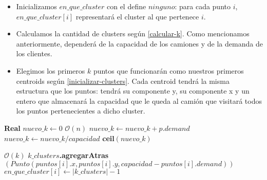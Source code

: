 \begin{itemize}
	\item Inicializamos $en\_que\_cluster$ con el define $ninguno$: para cada punto $i$, $en\_que\_cluster[i]$ representará el cluster al que pertenece $i$. 
	\item Calculamos la cantidad de clusters según \ref{calcular-k}. Como mencionamos anteriormente, dependerá de la capacidad de los camiones y de la demanda de los clientes.
	\item Elegimos los primeros $k$ puntos que funcionarán como nuestros primeros centroids según \ref{inicializar-clusters}. Cada centroid tendrá la misma estructura que los puntos: tendrá su componente y, su componente x y un entero que almacenará la capacidad que le queda al camión que visitará todos los puntos pertenecientes a dicho cluster.
\end{itemize}

\begin{algorithm}[H]
	\caption{\Comment $\mathcal{O}(n)$}
	\label{calcular-k}
	\begin{algorithmic}[1]
		\State \textbf{Real } $nuevo\_k \gets 0$
		 \Comment $\mathcal{O}(n)$
		\State $nuevo\_k \gets nuevo\_k + p.demand$
		\EndFor
		\State $nuevo\_k \gets nuevo\_k/capacidad$ 
		\State \Return \textbf{ceil}$(nuevo\_k)$
		\EndFunction
	\end{algorithmic}
\end{algorithm}

\begin{algorithm}[H]
	\caption{\Comment $\mathcal{O}(k)$}
	\label{inicializar-clusters}
	\begin{algorithmic}[1]
		 \Comment $\mathcal{O}(k)$
		\State $k\_clusters$\textbf{.agregarAtras}$(Punto(puntos[i].x, puntos[i].y, capacidad - puntos[i].demand))$
		\State $en\_que\_cluster[i] \gets |k\_clusters|-1$
		\EndFor
		\EndFunction
	\end{algorithmic}
\end{algorithm}


